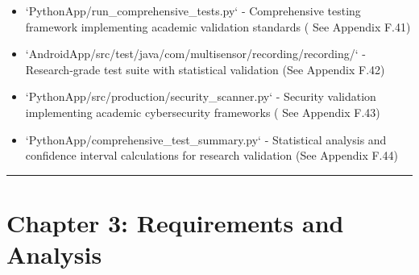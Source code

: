 \documentclass[12pt,a4paper]{report}
\begin{document}
\begin{itemize}
\item `PythonApp/run_comprehensive_tests.py` - Comprehensive testing framework implementing academic validation standards (
  See Appendix F.41)
\item `AndroidApp/src/test/java/com/multisensor/recording/recording/` - Research-grade test suite with statistical
  validation (See Appendix F.42)
\item `PythonApp/src/production/security_scanner.py` - Security validation implementing academic cybersecurity frameworks (
  See Appendix F.43)
\item `PythonApp/comprehensive_test_summary.py` - Statistical analysis and confidence interval calculations for research
  validation (See Appendix F.44)

\end{itemize}
\hrule

\section{Chapter 3: Requirements and Analysis}
\end{document}
